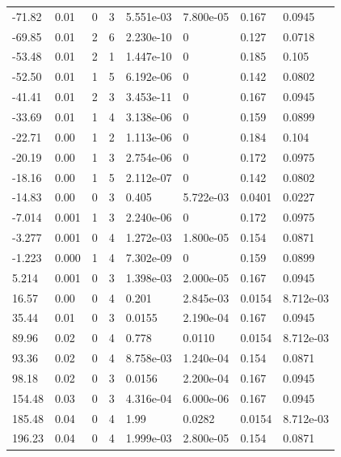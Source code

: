\documentclass[preview]{standalone}
\begin{document}
{{\begin{tabular}{L{1.2cm}C{1.2cm} C{0.3cm}C{0.5cm} C{1.4cm}C{1.4cm} C{1.4cm}C{1.4cm}}
  -71.82  &  0.01  & 0     &  3 &  5.551e-03  & 7.800e-05  & 0.167 &  0.0945   \\ 
  -69.85  &  0.01  & 2     &  6 &  2.230e-10  & 0  & 0.127 &  0.0718   \\ 
  -53.48  &  0.01  & 2     &  1 &  1.447e-10  & 0  & 0.185 &  0.105   \\ 
  -52.50  &  0.01  & 1     &  5 &  6.192e-06  & 0  & 0.142 &  0.0802   \\ 
  -41.41  &  0.01  & 2     &  3 &  3.453e-11  & 0  & 0.167 &  0.0945   \\ 
  -33.69  &  0.01  & 1     &  4 &  3.138e-06  & 0  & 0.159 &  0.0899   \\ 
  -22.71  &  0.00  & 1     &  2 &  1.113e-06  & 0  & 0.184 &  0.104   \\ 
  -20.19  &  0.00  & 1     &  3 &  2.754e-06  & 0  & 0.172 &  0.0975   \\ 
  -18.16  &  0.00  & 1     &  5 &  2.112e-07  & 0  & 0.142 &  0.0802   \\ 
  -14.83  &  0.00  & 0     &  3 &  0.405  & 5.722e-03  & 0.0401 &  0.0227   \\ 
  -7.014  &  0.001  & 1     &  3 &  2.240e-06  & 0  & 0.172 &  0.0975   \\ 
  -3.277  &  0.001  & 0     &  4 &  1.272e-03  & 1.800e-05  & 0.154 &  0.0871   \\ 
  -1.223  &  0.000  & 1     &  4 &  7.302e-09  & 0  & 0.159 &  0.0899   \\ 
  5.214  &  0.001  & 0     &  3 &  1.398e-03  & 2.000e-05  & 0.167 &  0.0945   \\ 
  16.57  &  0.00  & 0     &  4 &  0.201  & 2.845e-03  & 0.0154 &  8.712e-03   \\ 
  35.44  &  0.01  & 0     &  3 &  0.0155  & 2.190e-04  & 0.167 &  0.0945   \\ 
  89.96  &  0.02  & 0     &  4 &  0.778  & 0.0110  & 0.0154 &  8.712e-03   \\ 
  93.36  &  0.02  & 0     &  4 &  8.758e-03  & 1.240e-04  & 0.154 &  0.0871   \\ 
  98.18  &  0.02  & 0     &  3 &  0.0156  & 2.200e-04  & 0.167 &  0.0945   \\ 
  154.48  &  0.03  & 0     &  3 &  4.316e-04  & 6.000e-06  & 0.167 &  0.0945   \\ 
  185.48  &  0.04  & 0     &  4 &  1.99  & 0.0282  & 0.0154 &  8.712e-03   \\ 
  196.23  &  0.04  & 0     &  4 &  1.999e-03  & 2.800e-05  & 0.154 &  0.0871   \\ 

\end{tabular}}}
\end{document}
